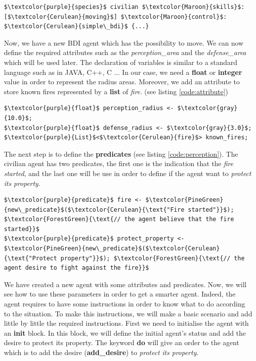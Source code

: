 \documentclass[12pt, a4paper]{memoir} %
\begin{document}
			\begin{lstlisting}[mathescape,caption=BDI agent declaration.,label=code:bdi]
$\textcolor{purple}{species}$ civilian $\textcolor{Maroon}{skills}$:[$\textcolor{Cerulean}{moving}$] $\textcolor{Maroon}{control}$: $\textcolor{Cerulean}{simple\_bdi}$ {...}
			\end{lstlisting}

			Now, we have a new BDI agent which has the possibility to move. We can now define the required attributes such as the \textit{perception\_area} and the \textit{defense\_area}
			which will be used later. The declaration of variables is similar to a standard language such as in JAVA, C++, C ... In our case, we need a \textbf{float} or \textbf{integer} value in order to represent
			the radius areas. Moreover, we add an attribute to store known fires represented by a \textbf{list} of \textit{fire}. (see listing \ref{code:attribute})

			\begin{lstlisting}[mathescape,caption=Attributes declaration.,label=code:attribute]
$\textcolor{purple}{float}$ perception_radius <- $\textcolor{gray}{10.0}$;
$\textcolor{purple}{float}$ defense_radius <- $\textcolor{gray}{3.0}$;
$\textcolor{purple}{List}$<$\textcolor{Cerulean}{fire}$> known_fires;
			\end{lstlisting}

			The next step is to define the \textbf{predicates} (see listing \ref{code:perception}). The civilian agent has two predicates, the first one is the indication that the \textit{fire started},
			and the last one will be use in order to define if the agent want to \textit{protect its property}.

			\begin{lstlisting}[mathescape,caption=Predicates declaration.,label=code:perception]
$\textcolor{purple}{predicate}$ fire <- $\textcolor{PineGreen}{new\_predicate}$($\textcolor{Cerulean}{\text{"Fire started"}}$); $\textcolor{ForestGreen}{\text{// the agent believe that the fire started}}$
$\textcolor{purple}{predicate}$ protect_property <- $\textcolor{PineGreen}{new\_predicate}$($\textcolor{Cerulean}{\text{"Protect property"}}$); $\textcolor{ForestGreen}{\text{// the agent desire to fight against the fire}}$
			\end{lstlisting}

			We have created a new agent with some attributes and predicates. Now, we will see how to use these parameters in order to get a smarter agent. Indeed, the agent requires to have some instructions in order to
			know what to do according to the situation. To make this instructions, we will make a basic scenario and add little by little the required instructions.
			First we need to initialise the agent with an \textbf{init} block. In this block, we will define the initial agent's status and add the desire to protect its property.
			The keyword \textbf{do} will give an order to the agent which is to add the desire (\textbf{add\_desire}) to \textit{protect its property}.
\end{document}
